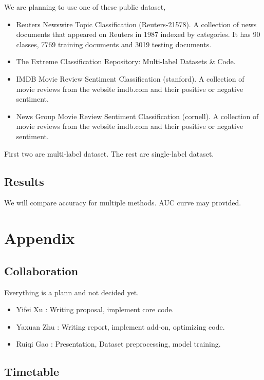 \documentclass{article}
\begin{document}
We are planning to use one of these public dataset, 

\begin{itemize}
  \item  Reuters Newswire Topic Classification (Reuters-21578). A collection of news documents that appeared on Reuters in 1987 indexed by categories. It has 90 classes, 7769 training documents and 3019 testing documents. 
  \item The Extreme Classification Repository: Multi-label Datasets \& Code.
  \item  IMDB Movie Review Sentiment Classification (stanford). A collection of movie reviews from the website imdb.com and their positive or negative sentiment.
  \item News Group Movie Review Sentiment Classification (cornell). A collection of movie reviews from the website imdb.com and their positive or negative sentiment.
\end{itemize}

First two are multi-label dataset. The rest are single-label dataset.

\subsection{Results}

We will compare accuracy for multiple methods. AUC curve may provided.

\section{Appendix}

\subsection{Collaboration}

Everything is a plann and not decided yet.

\begin{itemize}
  \item  Yifei Xu : Writing proposal, implement core code.
  \item  Yaxuan Zhu : Writing report, implement add-on, optimizing code.
  \item Ruiqi Gao : Presentation, Dataset preprocessing, model  training.
\end{itemize}

\subsection{Timetable}
\end{document}
